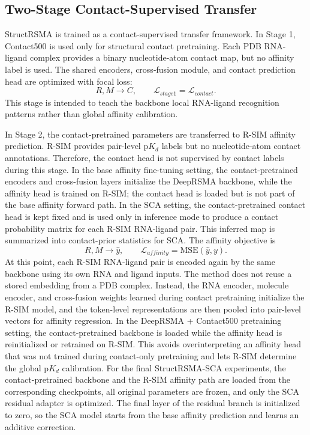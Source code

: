 \documentclass[journal=jcisd8,manuscript=article]{achemso}
\begin{document}
\subsection{Two-Stage Contact-Supervised Transfer}

StructRSMA is trained as a contact-supervised transfer framework. In Stage 1, Contact500 is used only for structural contact pretraining. Each PDB RNA-ligand complex provides a binary nucleotide-atom contact map, but no affinity label is used. The shared encoders, cross-fusion module, and contact prediction head are optimized with focal loss:
\begin{equation}
R,M \rightarrow C, \qquad \mathcal{L}_{stage1} = \mathcal{L}_{contact}.
\end{equation}
This stage is intended to teach the backbone local RNA-ligand recognition patterns rather than global affinity calibration.

In Stage 2, the contact-pretrained parameters are transferred to R-SIM affinity prediction. R-SIM provides pair-level p$K_d$ labels but no nucleotide-atom contact annotations. Therefore, the contact head is not supervised by contact labels during this stage. In the base affinity fine-tuning setting, the contact-pretrained encoders and cross-fusion layers initialize the DeepRSMA backbone, while the affinity head is trained on R-SIM; the contact head is loaded but is not part of the base affinity forward path. In the SCA setting, the contact-pretrained contact head is kept fixed and is used only in inference mode to produce a contact probability matrix for each R-SIM RNA-ligand pair. This inferred map is summarized into contact-prior statistics for SCA. The affinity objective is
\begin{equation}
R,M \rightarrow \hat{y}, \qquad
\mathcal{L}_{affinity} = \mathrm{MSE}(\hat{y},y).
\end{equation}
At this point, each R-SIM RNA-ligand pair is encoded again by the same backbone using its own RNA and ligand inputs. The method does not reuse a stored embedding from a PDB complex. Instead, the RNA encoder, molecule encoder, and cross-fusion weights learned during contact pretraining initialize the R-SIM model, and the token-level representations are then pooled into pair-level vectors for affinity regression.
In the DeepRSMA + Contact500 pretraining setting, the contact-pretrained backbone is loaded while the affinity head is reinitialized or retrained on R-SIM. This avoids overinterpreting an affinity head that was not trained during contact-only pretraining and lets R-SIM determine the global p$K_d$ calibration. For the final StructRSMA-SCA experiments, the contact-pretrained backbone and the R-SIM affinity path are loaded from the corresponding checkpoints, all original parameters are frozen, and only the SCA residual adapter is optimized. The final layer of the residual branch is initialized to zero, so the SCA model starts from the base affinity prediction and learns an additive correction.
\end{document}
